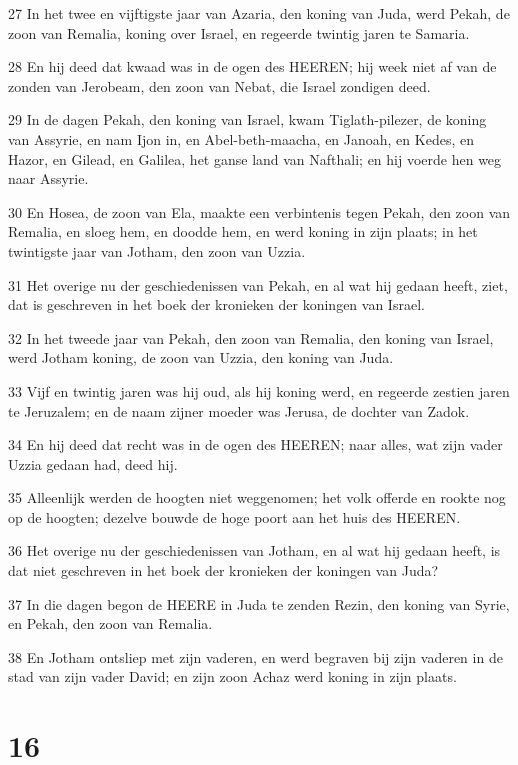 \par 27 In het twee en vijftigste jaar van Azaria, den koning van Juda, werd Pekah, de zoon van Remalia, koning over Israel, en regeerde twintig jaren te Samaria.
\par 28 En hij deed dat kwaad was in de ogen des HEEREN; hij week niet af van de zonden van Jerobeam, den zoon van Nebat, die Israel zondigen deed.
\par 29 In de dagen Pekah, den koning van Israel, kwam Tiglath-pilezer, de koning van Assyrie, en nam Ijon in, en Abel-beth-maacha, en Janoah, en Kedes, en Hazor, en Gilead, en Galilea, het ganse land van Nafthali; en hij voerde hen weg naar Assyrie.
\par 30 En Hosea, de zoon van Ela, maakte een verbintenis tegen Pekah, den zoon van Remalia, en sloeg hem, en doodde hem, en werd koning in zijn plaats; in het twintigste jaar van Jotham, den zoon van Uzzia.
\par 31 Het overige nu der geschiedenissen van Pekah, en al wat hij gedaan heeft, ziet, dat is geschreven in het boek der kronieken der koningen van Israel.
\par 32 In het tweede jaar van Pekah, den zoon van Remalia, den koning van Israel, werd Jotham koning, de zoon van Uzzia, den koning van Juda.
\par 33 Vijf en twintig jaren was hij oud, als hij koning werd, en regeerde zestien jaren te Jeruzalem; en de naam zijner moeder was Jerusa, de dochter van Zadok.
\par 34 En hij deed dat recht was in de ogen des HEEREN; naar alles, wat zijn vader Uzzia gedaan had, deed hij.
\par 35 Alleenlijk werden de hoogten niet weggenomen; het volk offerde en rookte nog op de hoogten; dezelve bouwde de hoge poort aan het huis des HEEREN.
\par 36 Het overige nu der geschiedenissen van Jotham, en al wat hij gedaan heeft, is dat niet geschreven in het boek der kronieken der koningen van Juda?
\par 37 In die dagen begon de HEERE in Juda te zenden Rezin, den koning van Syrie, en Pekah, den zoon van Remalia.
\par 38 En Jotham ontsliep met zijn vaderen, en werd begraven bij zijn vaderen in de stad van zijn vader David; en zijn zoon Achaz werd koning in zijn plaats.

\chapter{16}

